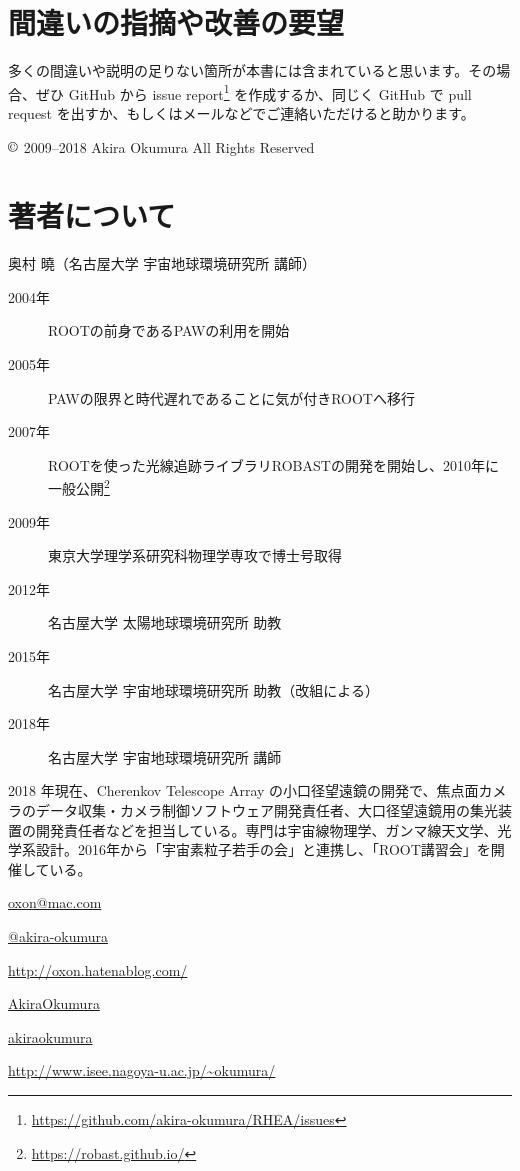 \documentclass[oneside]{jsbook}
\makeatletter
\def\@listoflistenv{[NoFloat][listings][lstlisting]}
\newif\if@expire@floats \@expire@floatsfalse
\def\begin#1{%
   \@ifundefined{#1}%
      {\def\reserved@a{\@latex@error{Environment #1 undefined}\@eha}}%
      {\def\reserved@a{\def\@currenvir{#1}%
          \edef\@currenvline{\on@line}%
          \@check@listenv
          \csname #1\endcsname}}%
       \@ignorefalse
   \begingroup\@endpefalse\reserved@a}
\def\@check@listenv{%
   \@expandtwoargs\in@{[\@currenvir]}{\@listoflistenv}%
   \ifin@ \@expire@floatstrue \fi}
\makeatother
\begin{document}
\section*{間違いの指摘や改善の要望}
多くの間違いや説明の足りない箇所が本書には含まれていると思います。その場合、ぜひ GitHub から issue report\footnote{\url{https://github.com/akira-okumura/RHEA/issues}} を作成するか、同じく GitHub で pull request を出すか、もしくはメールなどでご連絡いただけると助かります。

\begin{flushright}
$\copyright$ 2009--2018 Akira Okumura All Rights Reserved
\end{flushright}

\pagebreak

\section*{著者について}
{\large 奥村 曉（名古屋大学 宇宙地球環境研究所 講師）}
         
\begin{description}
  \item[\quad2004年]ROOTの前身であるPAWの利用を開始
  \item[\quad2005年]PAWの限界と時代遅れであることに気が付きROOTへ移行
  \item[\quad2007年]ROOTを使った光線追跡ライブラリROBASTの開発を開始し、2010年に一般公開\footnote{\url{https://robast.github.io/}}
  \item[\quad2009年]東京大学理学系研究科物理学専攻で博士号取得
  \item[\quad2012年]名古屋大学 太陽地球環境研究所 助教
  \item[\quad2015年]名古屋大学 宇宙地球環境研究所 助教（改組による）
  \item[\quad2018年]名古屋大学 宇宙地球環境研究所 講師
\end{description}

2018 年現在、Cherenkov Telescope Array の小口径望遠鏡の開発で、焦点面カメラのデータ収集・カメラ制御ソフトウェア開発責任者、大口径望遠鏡用の集光装置の開発責任者などを担当している。専門は宇宙線物理学、ガンマ線天文学、光学系設計。2016年から「宇宙素粒子若手の会」と連携し、「ROOT講習会」を開催している。

\begin{description}[labelwidth=2.cm]
  \item[\quad 電子メール]\url{oxon@mac.com}
  \item[\quad GitHub]\href{https://github.com/akira-okumura}{@akira-okumura}
  \item[\quad blog]\url{http://oxon.hatenablog.com/}
  \item[\quad Twitter]\href{https://twitter.com/AkiraOkumura}{AkiraOkumura}
  \item[\quad Flickr]\href{https://www.flickr.com/photos/akiraokumura/}{akiraokumura}
  \item[\quad 個人ページ]\url{http://www.isee.nagoya-u.ac.jp/~okumura/}
\end{description}
\end{document}
